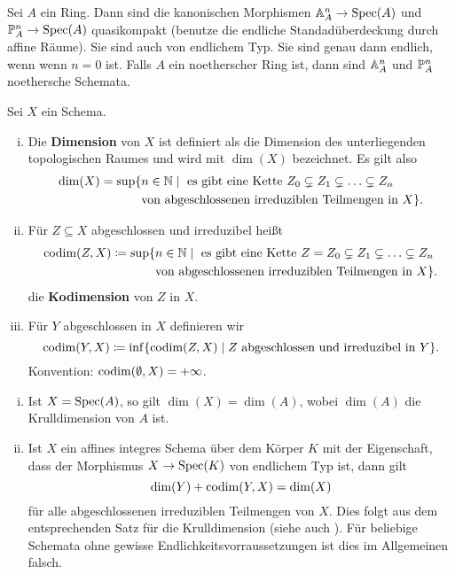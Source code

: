\begin{bsp}
\label{bsp:6.12}
	Sei $A$ ein Ring. Dann sind die kanonischen Morphismen $\A^n_A \to \Spec(A)$ und $\P^n_A\to\Spec(A)$ quasikompakt (benutze die endliche Standadüberdeckung durch affine Räume). Sie sind auch von endlichem Typ. Sie sind genau dann endlich, wenn wenn $n = 0$ ist. Falls $A$ ein noetherscher Ring ist, dann sind $\A_A^n$ und $\P_A^n$ noethersche Schemata.
\end{bsp}

\begin{defn}
\label{defn:6.13}
	Sei $X$ ein Schema.
	\begin{enumerate}[i)]
		\item Die \textbf{Dimension} von $X$ ist definiert als die Dimension des unterliegenden topologischen Raumes und wird mit $\dim(X)$ bezeichnet. Es gilt also
		\begin{align*}
			\dim(X) = \sup\{&n \in \N \mid \text{ es gibt eine Kette }Z_0 \subsetneq Z_1 \subsetneq \ldots \subsetneq Z_n\\
			&\text{von abgeschlossenen irreduziblen Teilmengen in }X\}.
		\end{align*}
		\item Für $Z \subseteq X$ abgeschlossen und irreduzibel heißt
		\begin{align*}
			\codim(Z,X) \coloneqq \sup\{&n \in \N \mid \text{ es gibt eine Kette } Z = Z_0 \subsetneq Z_1 \subsetneq \ldots \subsetneq Z_n\\
			&\text{von abgeschlossenen irreduziblen Teilmengen in }X\}.
		\end{align*}
		die \textbf{Kodimension} von $Z$ in $X$.
		\item Für $Y$ abgeschlossen in $X$ definieren wir
		\[
			\codim(Y,X) \coloneqq \inf\{\codim(Z,X) \mid Z \text{ abgeschlossen und irreduzibel in } Y\}.
		\]
		Konvention: $\codim(\emptyset,X) = +\infty$.
	\end{enumerate}	
\end{defn}

\begin{bem}
\label{bem:6.14}
	\begin{enumerate}[i)]
		\item Ist $X = \Spec(A)$, so gilt $\dim(X) = \dim(A)$, wobei $\dim(A)$ die Krulldimension von $A$ ist.
		\item Ist $X$ ein affines integres Schema über dem Körper $K$ mit der Eigenschaft, dass der Morphismus $X \to \Spec(K)$ von endlichem Typ ist, dann gilt
		\[
			\dim(Y) + \codim(Y,X) = \dim(X)
		\]
		für alle abgeschlossenen irreduziblen Teilmengen von $X$. Dies folgt aus dem entsprechenden Satz für die Krulldimension (siehe auch \cite[Chapter 5, §14]{matsumura1970commutative}). Für beliebige Schemata ohne gewisse Endlichkeitsvorraussetzungen ist dies im Allgemeinen falsch.
	\end{enumerate}
\end{bem}



